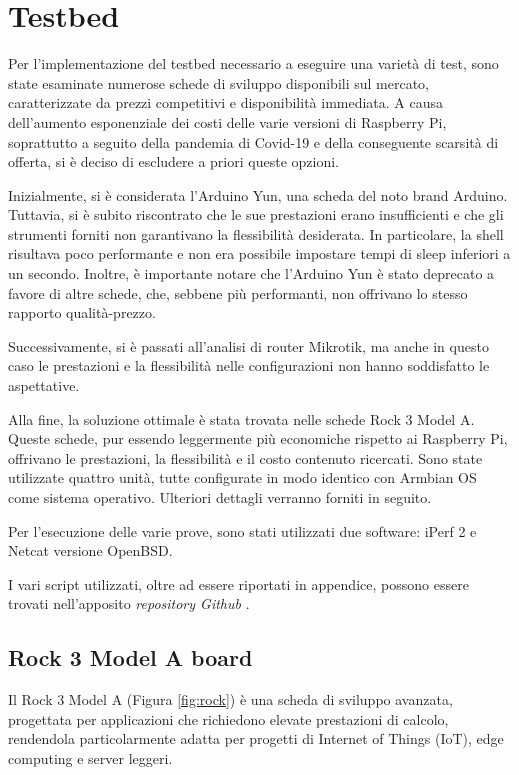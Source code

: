 \chapter{Testbed}

Per l'implementazione del testbed necessario a eseguire una varietà di test, sono state esaminate numerose schede di sviluppo disponibili sul mercato, caratterizzate da prezzi competitivi e disponibilità immediata. A causa dell'aumento esponenziale dei costi delle varie versioni di Raspberry Pi, soprattutto a seguito della pandemia di Covid-19 e della conseguente scarsità di offerta, si è deciso di escludere a priori queste opzioni.

Inizialmente, si è considerata l'Arduino Yun, una scheda del noto brand Arduino. Tuttavia, si è subito riscontrato che le sue prestazioni erano insufficienti e che gli strumenti forniti non garantivano la flessibilità desiderata. In particolare, la shell risultava poco performante e non era possibile impostare tempi di sleep inferiori a un secondo. Inoltre, è importante notare che l'Arduino Yun è stato deprecato a favore di altre schede, che, sebbene più performanti, non offrivano lo stesso rapporto qualità-prezzo.

Successivamente, si è passati all'analisi di router Mikrotik, ma anche in questo caso le prestazioni e la flessibilità nelle configurazioni non hanno soddisfatto le aspettative.

Alla fine, la soluzione ottimale è stata trovata nelle schede Rock 3 Model A. Queste schede, pur essendo leggermente più economiche rispetto ai Raspberry Pi, offrivano le prestazioni, la flessibilità e il costo contenuto ricercati. Sono state utilizzate quattro unità, tutte configurate in modo identico con Armbian OS come sistema operativo. Ulteriori dettagli verranno forniti in seguito.

Per l'esecuzione delle varie prove, sono stati utilizzati due software: iPerf 2 e Netcat versione OpenBSD.

I vari script utilizzati, oltre ad essere riportati in appendice, possono essere trovati nell'apposito \textit{repository Github} \cite{DCCo802.11}.

\section{Rock 3 Model A board}

Il Rock 3 Model A (Figura \ref{fig:rock}) è una scheda di sviluppo avanzata, progettata per applicazioni che richiedono elevate prestazioni di calcolo, rendendola particolarmente adatta per progetti di Internet of Things (IoT), edge computing e server leggeri. 

